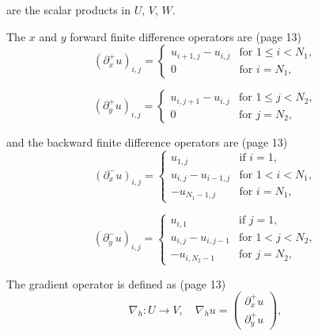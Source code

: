 \documentclass{article}
\begin{document}
are the scalar products in $U$, $V$, $W$.
\newline


The $x$ and $y$ forward finite difference operators are (page 13)
\begin{equation}
(\partial_x^+ u)_{i,j} =
\begin{cases}
u_{i+1,j} - u_{i,j} & \text{for } 1 \leq i < N_1, \\
0 & \text{for } i = N_1,
\end{cases}
\end{equation}

\begin{equation}
(\partial_y^+ u)_{i,j} =
\begin{cases}
u_{i,j+1} - u_{i,j} & \text{for } 1 \leq j < N_2, \\
0 & \text{for } j = N_2,
\end{cases}
\end{equation}

and the backward finite difference operators are (page 13)
\begin{equation}
    (\partial_x^- u)_{i,j} = 
    \begin{cases}
    u_{1,j} & \text{if } i = 1, \\
    u_{i,j} - u_{i-1,j} & \text{for } 1 < i < N_1, \\
    -u_{N_1-1,j} & \text{for } i = N_1,
    \end{cases}
\end{equation}
    
\begin{equation}
    (\partial_y^- u)_{i,j} = 
    \begin{cases}
    u_{i,1} & \text{if } j = 1, \\
    u_{i,j} - u_{i,j-1} & \text{for } 1 < j < N_2, \\
    -u_{i,N_2-1} & \text{for } j = N_2,
    \end{cases}
\end{equation}






The gradient operator is defined as (page 13)
\begin{equation}
    \nabla_h : U \rightarrow V, \quad \nabla_h u = 
    \begin{pmatrix}
    \partial_x^+ u \\
    \partial_y^+ u
    \end{pmatrix},
\end{equation}
\end{document}
